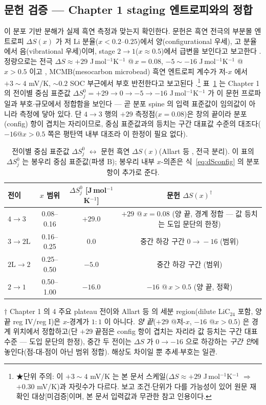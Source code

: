 \subsection{문헌 검증 --- Chapter 1 staging 엔트로피와의 정합}\label{ssec:litverif}
이 분포 기반 분해가 실제 흑연 측정과 맞는지 확인한다. 문헌은 흑연 전극의 부분몰 엔트로피 $\Delta S(x)$ 가
저 Li 분율($x<0.2$--$0.25$)에서 양(configurational 우세), 고 분율에서 음(vibrational 우세)이며, stage
$2\to1$($x\approx0.5$)에서 급변을 보인다고 보고한다 \cite{reynier2003,allart2018}. 정량으로는 전극
$\Delta S\approx+29$ J\,mol$^{-1}$K$^{-1}$ @\,$x=0.08$, $-5\sim-16$ J\,mol$^{-1}$K$^{-1}$ @\,$x>0.5$ 이고
\cite{allart2018}, MCMB(mesocarbon microbead) 흑연 엔트로피 계수가 저-$x$ 에서 $+3\sim4$ mV/K,
$\sim0.2$ SOC 부근에서 부호 반전한다고 보고된다 \cite{msmr_partII}.\footnote{★단위 주의: 이 $+3\sim4$ mV/K 는
본 문서 스케일($\Delta S\approx+29$ J\,mol$^{-1}$K$^{-1}$ $\Rightarrow$ $+0.30$ mV/K)과 자릿수가 다르다. 보고
조건$\cdot$단위가 다를 가능성이 있어 원문 재확인 대상[미검증]이며, 본 문서 입력값과 무관한 참고 인용이다.}
표~\ref{tab:ds} 는 Chapter 1 의 전이별 중심 표준값 $\Delta S^0_j=+29\to0\to-5\to-16$ J\,mol$^{-1}$K$^{-1}$ 가
이 문헌 프로파일과 부호$\cdot$규모에서 정합함을 보인다 --- 곧 분포 spine 의 입력 표준값이 임의값이 아니라
측정에 닿아 있다. 단 $4\!\to\!3$ 행의 $+29$ 측정점($x{=}0.08$)은 창의 끝이라 분포(config) 항이 겹치는
자리이므로, 중심 표준값과의 등치는 구간 대표값 수준의 대조다($-16$@$x>0.5$ 쪽은 평탄역 내부 대조라 이 한정이
필요 없다).

\begin{table}[t]
\centering\small
\renewcommand{\arraystretch}{1.2}
\caption{전이별 중심 표준값 $\Delta S^0_j$ $\leftrightarrow$ 문헌 흑연 $\Delta S(x)$(Allart 등
\cite{allart2018}, 전극 분리). 이 표의 $\Delta S^0_j$ 는 봉우리 중심 표준값(파생 B); 봉우리 내부 $x$-의존은
식~\eqref{eq:dSconfig} 의 분포 항이 추가로 준다.}
\label{tab:ds}
\begin{tabular}{l c c c}
\toprule
전이 & $x$ 범위 & $\Delta S^0_j$ [J\,mol$^{-1}$K$^{-1}$] & 문헌 $\Delta S(x)^\dagger$ \\
\midrule
$4\!\to\!3$ & 0.08–0.16 & $+29.0$ & $+29$ @\,$x{=}0.08$ (양 끝, 경계 정합 --- 값 등치는 도입 문단의 한정) \\
$3\!\to\!2\mathrm L$ & 0.16–0.25 & $0.0$ & 중간 하강 구간 $0\!\to\!-16$ (범위) \\
$2\mathrm L\!\to\!2$ & 0.25–0.50 & $-5.0$ & 중간 하강 구간 (범위) \\
$2\!\to\!1$ & 0.50–1.00 & $-16.0$ & $-16$ @\,$x{>}0.5$ (양 끝, 정확) \\
\bottomrule
\end{tabular}

\smallskip
{\footnotesize $\dagger$ Chapter 1 의 4 주요 plateau 전이와 Allart 등 \cite{allart2018} 의 세분 region(dilute
LiC$_{24}$ 포함, 양 끝 reg IV/reg I)은 $x$-경계가 $1{:}1$ 이 아니다. \emph{양 끝}($+29$ @저-$x$, $-16$ @$x{>}0.5$)
은 경계 위치에서 정합하고(단 $+29$ 끝점은 config 항이 겹치는 자리라 값 등치는 구간 대표 수준 --- 도입
문단의 한정), 중간 두 전이는 $\Delta S$ 가 $0\to-16$ 으로 하강하는 \emph{구간 안}에 놓인다(점-대-점이 아닌
범위 정합). 해상도 차이일 뿐 추세$\cdot$부호는 일관.}
\end{table}

